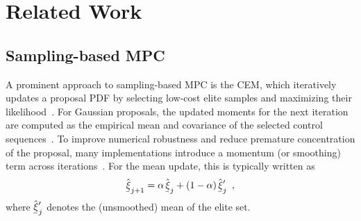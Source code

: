 \section{Related Work}
\label{sec:related_work}

\subsection{Sampling-based \acs*{MPC}}

A prominent approach to sampling-based \ac{MPC} is the \ac{CEM}, which iteratively updates a proposal \ac{PDF} by selecting low-cost elite samples and maximizing their likelihood~\cite{rubinsteinCrossEntropy2004}.
For Gaussian proposals, the updated moments for the next iteration are computed as the empirical mean and covariance of the selected control sequences~\cite{rubinsteinCrossEntropy2004}.
To improve numerical robustness and reduce premature concentration of the proposal, many implementations introduce a momentum (or smoothing) term across iterations~\cite{rubinsteinCrossEntropy2004,pinneriSampleefficientCrossentropyMethod2021}.
For the mean update, this is typically written as
\begin{align}
    \label{eq:cem_momentum_mean}
    \evVarCem_{j+1} = \alpha \, \evVarCem_{j} + (1-\alpha) \, \evVarCem_{j}^{\prime} \enspace,
\end{align}
where $\evVarCem_{j}^{\prime}$ denotes the (unsmoothed) mean of the elite set.

